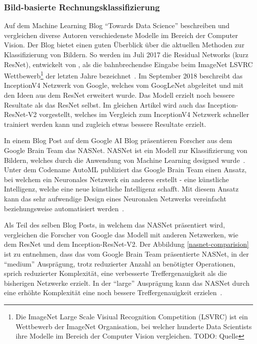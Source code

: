 \subsubsection{Bild-basierte Rechnungsklassifizierung}
\label{chap:image-recon}


Auf dem Machine Learning Blog \enquote{Towards Data Science} beschreiben und vergleichen diverse Autoren verschiedenste Modelle im Bereich der Computer Vision. Der Blog bietet einen guten Überblick über die aktuellen Methoden zur Klassifizierung von Bildern. So werden im Juli 2017 die Residual Networks (kurz ResNet), entwickelt von \textcite{He2015}, als die bahnbrechendse Eingabe beim ImageNet LSVRC Wettbewerb\footnote{Die ImageNet Large Scale Visiual Recognition Competition (LSVRC) ist ein Wettbewerb der ImageNet Organisation, bei welcher hunderte Data Scientists ihre Modelle im Bereich der Computer Vision vergleichen. TODO: Quelle} der letzten Jahre bezeichnet~\autocite{Fungg2017ResNet}. Im September 2018 beschreibt \textcite{SHTsuang2018Inception} das InceptionV4 Netzwerk von Google, welches vom GoogLeNet abgeleitet und mit den Ideen aus dem ResNet erweitert wurde. Das Modell erzielt noch bessere Resultate als das ResNet selbst. Im gleichen Artikel wird auch das Inception-ResNet-V2 vorgestellt, welches im Vergleich zum InceptionV4 Netzwerk schneller trainiert werden kann und zugleich etwas bessere Resultate erzielt. 

In einem Blog Post auf dem Google AI Blog präsentieren Forscher aus dem Google Brain Team das NASNet. NASNet ist ein Modell zur Klassifizierung von Bildern, welches durch die Anwendung von Machine Learning designed wurde~\autocite{GoogleNasNet}. Unter dem Codename AutoML publiziert das Google Brain Team einen Ansatz, bei welchem ein Neuronales Netzwerk ein anderes erstellt - eine künstliche Intelligenz, welche eine neue künstliche Intelligenz schafft. Mit diesem Ansatz kann das sehr aufwendige Design eines Neuronalen Netzwerks vereinfacht beziehungsweise automatisiert werden~\autocite{GoogleAutoML}.


Als Teil des selben Blog Posts, in welchem das NASNet präsentiert wird, vergleichen die Forscher von Google das Modell mit anderen Netzwerken, wie dem ResNet und dem Inception-ResNet-V2. Der Abbildung \ref{nasnet-comparision} ist zu entnehmen, dass das vom Google Brain Team präsentierte NASNet, in der \enquote{medium} Ausprägung, trotz reduzierter Anzahl an benötigter Operationen, sprich reduzierter Komplexität, eine verbesserte Treffergenauigkeit als die bisherigen Netzwerke erzielt. In der \enquote{large} Ausprägung kann das NASNet durch eine erhöhte Komplexität eine noch bessere Treffergenauigkeit erzielen~\autocite{GoogleNasNet}.

